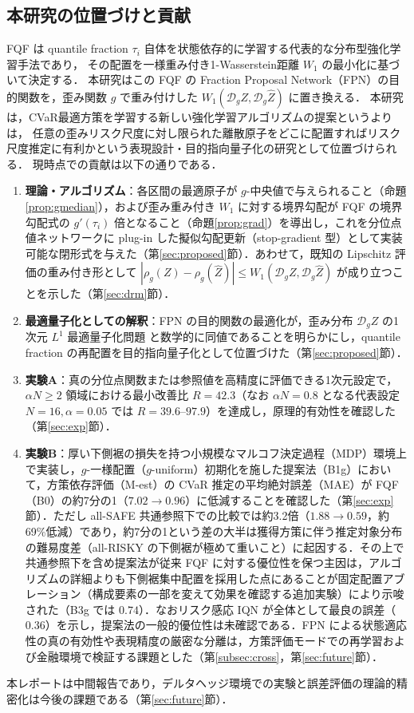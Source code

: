 \documentclass[a4paper,10pt]{jsarticle}
\theoremstyle{definition}
\newcommand{\Wone}{W_1}
\newcommand{\dist}{\mathcal{D}_g}
\begin{document}
\subsection{本研究の位置づけと貢献}
FQF \cite{yang2019fqf} は quantile fraction $\tau_i$ 自体を状態依存的に学習する代表的な分布型強化学習手法であり，
その配置を一様重み付き1-Wasserstein距離 $\Wone$ の最小化に基づいて決定する．
本研究はこの FQF の Fraction Proposal Network（FPN）の目的関数を，歪み関数 $g$ で重み付けした $\Wone(\dist Z,\dist\hat{Z})$ に置き換える．
本研究は，CVaR最適方策を学習する新しい強化学習アルゴリズムの提案というよりは，
任意の歪みリスク尺度に対し限られた離散原子をどこに配置すればリスク尺度推定に有利かという表現設計・目的指向量子化の研究として位置づけられる．
現時点での貢献は以下の通りである．
\begin{enumerate}
  \item \textbf{理論・アルゴリズム}：各区間の最適原子が $g$-中央値で与えられること（命題\ref{prop:gmedian}），および歪み重み付き $\Wone$ に対する境界勾配が FQF の境界勾配式の $g'(\tau_i)$ 倍となること（命題\ref{prop:grad}）を導出し，これを分位点値ネットワークに plug-in した擬似勾配更新（stop-gradient 型）として実装可能な閉形式を与えた（第\ref{sec:proposed}節）．あわせて，既知の Lipschitz 評価の重み付き形として $|\rho_g(Z)-\rho_g(\hat Z)|\le \Wone(\dist Z,\dist \hat Z)$ が成り立つことを示した（第\ref{sec:drm}節）．
  \item \textbf{最適量子化としての解釈}：FPN の目的関数の最適化が，歪み分布 $\dist Z$ の1次元 $L^1$ 最適量子化問題 \cite{graf2000quantization} と数学的に同値であることを明らかにし，quantile fraction の再配置を目的指向量子化として位置づけた（第\ref{sec:proposed}節）．
  \item \textbf{実験A}：真の分位点関数または参照値を高精度に評価できる1次元設定で，$\alpha N\ge2$ 領域における最小改善比 $R=42.3$（なお $\alpha N=0.8$ となる代表設定 $N=16, \alpha=0.05$ では $R=39.6$--$97.9$）を達成し，原理的有効性を確認した（第\ref{sec:exp}節）．
  \item \textbf{実験B}：厚い下側裾の損失を持つ小規模なマルコフ決定過程（MDP）環境上で実装し，$g$-一様配置（$g$-uniform）初期化を施した提案法（B1g）において，方策依存評価（M-est）の CVaR 推定の平均絶対誤差（MAE）が FQF（B0）の約7分の1（$7.02\to0.96$）に低減することを確認した（第\ref{sec:exp}節）．ただし all-SAFE 共通参照下での比較では約3.2倍（$1.88\to0.59$，約69\%低減）であり，約7分の1という差の大半は獲得方策に伴う推定対象分布の難易度差（all-RISKY の下側裾が極めて重いこと）に起因する．その上で共通参照下を含め提案法が従来 FQF に対する優位性を保つ主因は，アルゴリズムの詳細よりも下側裾集中配置を採用した点にあることが固定配置アブレーション（構成要素の一部を変えて効果を確認する追加実験）により示唆された（B3g では $0.74$）．なおリスク感応 IQN が全体として最良の誤差（$0.36$）を示し，提案法の一般的優位性は未確認である．FPN による状態適応性の真の有効性や表現精度の厳密な分離は，方策評価モードでの再学習および金融環境で検証する課題とした（第\ref{subsec:cross}，第\ref{sec:future}節）．
\end{enumerate}
本レポートは中間報告であり，デルタヘッジ環境での実験と誤差評価の理論的精密化は今後の課題である（第\ref{sec:future}節）．
\end{document}
